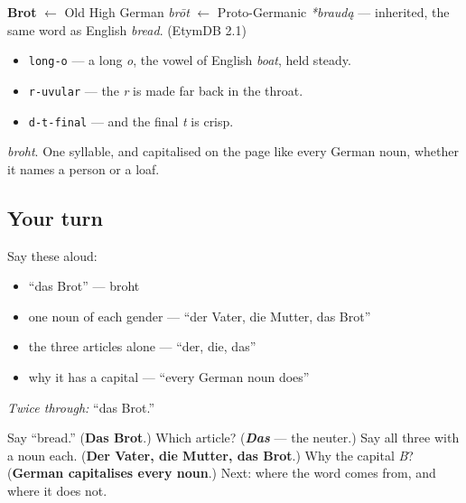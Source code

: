 \begin{cousinweb}
\textbf{Brot} $\leftarrow$ Old High German \emph{brōt} $\leftarrow$ Proto-Germanic \emph{*braudą} — inherited, the same word as English \emph{bread}. (EtymDB 2.1)
\end{cousinweb}

\begin{sounds}
\begin{itemize}
\raggedright
  \item \texttt{long-o} — a long \emph{o}, the vowel of English \emph{boat}, held steady.
  \item \texttt{r-uvular} — the \emph{r} is made far back in the throat.
  \item \texttt{d-t-final} — and the final \emph{t} is crisp.
\end{itemize}

\emph{broht}. One syllable, and capitalised on the page like every German noun, whether it names a person or a loaf.
\end{sounds}

\subsection*{Your turn}
Say these aloud:

\begin{itemize}
\raggedright
  \item \textquotedblleft{}das Brot\textquotedblright{} — broht
  \item one noun of each gender — \textquotedblleft{}der Vater, die Mutter, das Brot\textquotedblright{}
  \item the three articles alone — \textquotedblleft{}der, die, das\textquotedblright{}
  \item why it has a capital — \textquotedblleft{}every German noun does\textquotedblright{}
\end{itemize}

\emph{Twice through:} \textquotedblleft{}das Brot.\textquotedblright{}

\begin{tcolorbox}[breakable,colback=teal!4,colframe=teal!35!black,title={Before you move on}]
Say \textquotedblleft{}bread.\textquotedblright{} (\textbf{Das Brot}.) Which article? (\emph{\textbf{Das}} — the neuter.) Say all three with a noun each. (\textbf{Der Vater, die Mutter, das Brot}.) Why the capital \emph{B}? (\textbf{German capitalises every noun}.) Next: where the word comes from, and where it does not.
\end{tcolorbox}
